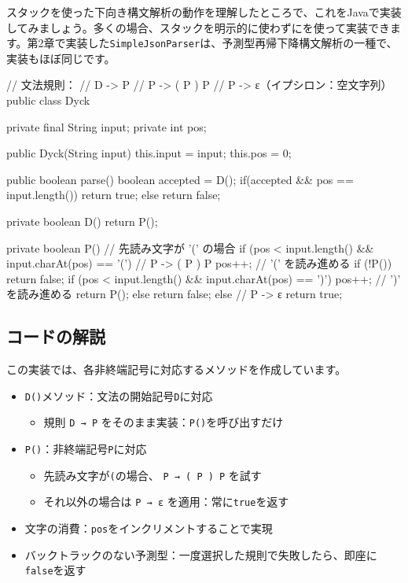 スタックを使った下向き構文解析の動作を理解したところで、これをJavaで実装してみましょう。多くの場合、スタックを明示的に使わずにを使って実装できます。第2章で実装した\texttt{SimpleJsonParser}は、予測型再帰下降構文解析の一種で、実装もほぼ同じです。

\begin{codescreen}{}
// 文法規則：
// D -> P
// P -> ( P ) P
// P -> ε（イプシロン：空文字列）
public class Dyck {
    private final String input;
    private int pos;

    public Dyck(String input) {
        this.input = input;
        this.pos = 0;
    }

    public boolean parse() {
        boolean accepted = D();
        if(accepted && pos == input.length()) {
            return true;
        } else {
            return false;
        }
    }

    private boolean D() {
        return P();
    }

    private boolean P() {
        // 先読み文字が '(' の場合
        if (pos < input.length() && input.charAt(pos) == '(') {
            // P -> ( P ) P
            pos++; // '(' を読み進める
            if (!P()) return false;
            if (pos < input.length() && input.charAt(pos) == ')') {
                pos++; // ')' を読み進める
                return P();
            } else {
                return false;
            }
        } else {
            // P -> ε
            return true;
        }
    }
}
\end{codescreen}

\subsection{コードの解説}

この実装では、各非終端記号に対応するメソッドを作成しています。

\begin{itemize}
\item
  \texttt{D()}メソッド：文法の開始記号\texttt{D}に対応

  \begin{itemize}
  \item
    規則 \texttt{D\ →\ P}
    をそのまま実装：\texttt{P()}を呼び出すだけ
  \end{itemize}
\item
  \texttt{P()}：非終端記号\texttt{P}に対応

  \begin{itemize}
  \item
    先読み文字が\texttt{(}の場合、 \texttt{P\ →\ (\ P\ )\ P}
    を試す
  \item
    それ以外の場合は \texttt{P\ →\ ε}
    を適用：常に\texttt{true}を返す
  \end{itemize}
\item
  文字の消費：\texttt{pos}をインクリメントすることで実現
\item
  バックトラックのない予測型：一度選択した規則で失敗したら、即座に\texttt{false}を返す
\end{itemize}

